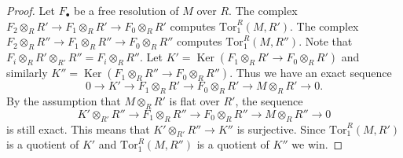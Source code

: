 \documentclass[10pt,a4paper]{amsart}
\theoremstyle{plain}
\theoremstyle{definition}
\theoremstyle{remark}
\numberwithin{equation}{subsection}
\def\Ker{\mathop{\mathrm{Ker}}}
\begin{document}
\begin{proof}
Let $F_\bullet$ be a free resolution of $M$ over $R$.
The complex $F_2 \otimes_R R' \to F_1\otimes_R R' \to F_0 \otimes_R R'$
computes $\text{Tor}_1^R(M, R')$.
The complex $F_2 \otimes_R R'' \to F_1\otimes_R R'' \to F_0 \otimes_R R''$
computes $\text{Tor}_1^R(M, R'')$. Note that
$F_i \otimes_R R' \otimes_{R'} R'' = F_i \otimes_R R''$. Let
$K' = \Ker(F_1\otimes_R R' \to F_0 \otimes_R R')$ and
similarly $K'' = \Ker(F_1\otimes_R R'' \to F_0 \otimes_R R'')$.
Thus we have an exact sequence
$$
0 \to K' \to F_1\otimes_R R' \to F_0 \otimes_R R' \to M \otimes_R R' \to 0.
$$
By the assumption that $M \otimes_R R'$ is flat over $R'$,
the sequence
$$
K' \otimes_{R'} R'' \to
F_1 \otimes_R R'' \to
F_0 \otimes_R R'' \to
M \otimes_R R'' \to 0
$$
is still exact. This means that $K' \otimes_{R'} R'' \to K''$
is surjective. Since $\text{Tor}_1^R(M, R')$ is a quotient of $K'$ and
$\text{Tor}_1^R(M, R'')$ is a quotient of $K''$ we win.
\end{proof}
\end{document}
